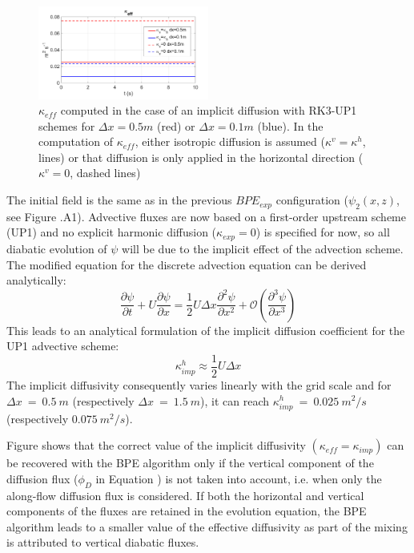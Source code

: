 \begin{figure}[h!]
\centering
\includegraphics[width=0.5\textwidth]{./CHAP_BPE/AGBPE_numlab3.png}
\caption[Evaluation of $\kappa_{eff}$ for configuration $BPE_{imp}$ with RK3-UP1 schemes]{$\kappa_{eff}$ computed in the case of an implicit diffusion with RK3-UP1 schemes for $\Delta x=0.5m$ (red) or $\Delta x=0.1m$ (blue). In the computation of $\kappa_{eff}$, either isotropic diffusion is assumed ($\kappa^v=\kappa^h$, lines) or that diffusion is only applied in the horizontal direction ($\kappa^v=0$, dashed lines)}
\label{fig3numlab}
\end{figure}
The initial field is the same as in the previous $BPE_{exp}$ configuration ($\psi_2(x,z)$, see Figure .A1). Advective fluxes are now based on a first-order upstream scheme (UP1) and no explicit harmonic diffusion ($\kappa_{exp}=0$) is specified for now, so all diabatic evolution of $\psi$ will be due to the implicit effect of the advection scheme.
The modified equation for the discrete advection equation can be derived analytically:
\begin{equation}
\frac{\partial \psi}{\partial t}+U \frac{\partial \psi}{\partial x} = \frac{1}{2} U \Delta x  \frac{\partial^2 \psi}{\partial x^2} + \mathcal{O}(\frac{\partial^3 \psi}{\partial x^3})
\end{equation}
This leads to an analytical formulation of the implicit diffusion coefficient for the UP1 advective scheme: 
\begin{equation}
    \displaystyle
    \kappa^h_{imp}\approx\frac{1}{2}U \Delta x
\end{equation}
The implicit diffusivity consequently varies linearly with the grid scale and for $\Delta x\ =\ 0.5\ m$ (respectively $\Delta x\ =\ 1.5\ m$), it can reach $\kappa^h_{imp}\ =\ 0.025\ m^2/s$  (respectively $0.075\ m^2/s$).

Figure  shows that the correct value of the implicit diffusivity $(\kappa_{eff}=\kappa_{imp})$ can be recovered with the BPE algorithm only if the vertical component of the diffusion flux ($\phi_D$ in Equation ) is not taken into account, i.e. when only the along-flow diffusion flux is considered. If both the horizontal and vertical components of the fluxes are retained in the evolution equation, the BPE algorithm leads to a smaller value of the effective diffusivity as part of the mixing is attributed to vertical diabatic fluxes.

